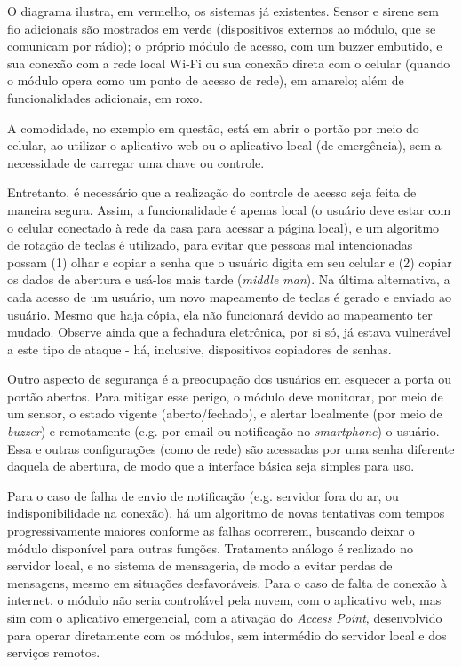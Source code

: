O diagrama ilustra, em vermelho, os sistemas já existentes. Sensor e sirene sem fio adicionais são mostrados em verde (dispositivos externos ao módulo, que se comunicam por rádio); o próprio módulo de acesso, com um buzzer embutido, e sua conexão com a rede local Wi-Fi ou sua conexão direta com o celular (quando o módulo opera como um ponto de acesso de rede), em amarelo; além de funcionalidades adicionais, em roxo.

A comodidade, no exemplo em questão, está em abrir o portão por meio do celular, ao utilizar o aplicativo web ou o aplicativo local (de emergência), sem a necessidade de carregar uma chave ou controle.

Entretanto, é necessário que a realização do controle de acesso seja feita de maneira segura. Assim, a funcionalidade é apenas local (o usuário deve estar com o celular conectado à rede da casa para acessar a página local), e um algoritmo de rotação de teclas é utilizado, para evitar que pessoas mal intencionadas possam (1) olhar e copiar a senha que o usuário digita em seu celular e (2) copiar os dados de abertura e usá-los mais tarde (\textit{middle man}). Na última alternativa, a cada acesso de um usuário, um novo mapeamento de teclas é gerado e enviado ao usuário. Mesmo que haja cópia, ela não funcionará devido ao mapeamento ter mudado. Observe ainda que a fechadura eletrônica, por si só, já estava vulnerável a este tipo de ataque - há, inclusive, dispositivos copiadores de senhas.

Outro aspecto de segurança é a preocupação dos usuários em esquecer a porta ou portão abertos. Para mitigar esse perigo, o módulo deve monitorar, por meio de um sensor, o estado vigente (aberto/fechado), e alertar localmente (por meio de \textit{buzzer}) e remotamente (e.g. por email ou notificação no \textit{smartphone}) o usuário. Essa e outras configurações (como de rede) são acessadas por uma senha diferente daquela de abertura, de modo que a interface básica seja simples para uso.

Para o caso de falha de envio de notificação (e.g. servidor fora do ar, ou indisponibilidade na conexão), há um algoritmo de novas tentativas com tempos progressivamente maiores conforme as falhas ocorrerem, buscando deixar o módulo disponível para outras funções. Tratamento análogo é realizado no servidor local, e no sistema de mensageria, de modo a evitar perdas de mensagens, mesmo em situações desfavoráveis. Para o caso de falta de conexão à internet, o módulo não seria controlável pela nuvem, com o aplicativo web, mas sim com o aplicativo emergencial, com a ativação do \textit{Access Point}, desenvolvido para operar diretamente com os módulos, sem intermédio do servidor local e dos serviços remotos.

